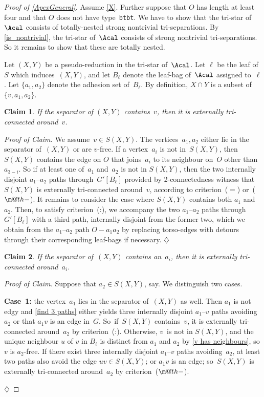 \documentclass{aic}
\makeatletter
\newenvironment{cproof}{\noindent\textit{Proof of Claim.}}{\phantom{!}\!\hfill$\diamondsuit$}
\theoremstyle{plain}
\newtheorem{sublem}{Claim}[thm]
\theoremstyle{definition}
\theoremstyle{plain}
\newcommand{\dotminus}{\mathbin{\text{\@dotminus}}}
\newcommand{\@dotminus}{%
  \ooalign{\hidewidth\raise1.2ex\hbox{.}\hidewidth\cr$\m@th-$\cr}%
}
\theoremstyle{plain}
\newcommand{\ty}[1]{{\tt#1}}
\makeatother
\begin{document}
\begin{proof}[Proof of \autoref{ApexGeneral}]
Assume \autoref{X}.
Further suppose that $O$ has length at least four and that $O$ does not have type~\ty{btbt}.
We have to show that the tri-star of~$\Acal$ consists of totally-nested strong nontrivial tri-separations.
By \autoref{is_nontrivial}, the tri-star of~$\Acal$ consists of strong nontrivial tri-separations.
So it remains to show that these are totally nested.

Let $(X,Y)$ be a pseudo-reduction in the tri-star of~$\Acal$.
Let $\ell$ be the leaf of~$S$ which induces~$(X,Y)$, and let $B_\ell$ denote the leaf-bag of~$\Acal$ assigned to~$\ell$.
Let $\{a_1,a_2\}$ denote the adhesion set of~$B_\ell$.
By definition, $X\cap Y$ is a subset of~$\{v,a_1,a_2\}$.

\begin{sublem}\label{sublemvinsep}
If the separator of $(X,Y)$ contains~$v$, then it is externally tri-connected around~$v$.
\end{sublem}


\begin{cproof}
We assume~$v\in S(X,Y)$.
The vertices~$a_1,a_2$ either lie in the separator 
of~$(X,Y)$ or are $v$-free.
If a vertex~$a_i$ is not in~$S(X,Y)$, then~$S(X,Y)$ contains the edge on $O$ that joins~$a_i$ to its neighbour on~$O$ other than $a_{3-i}$.
So if at least one of~$a_1$ and~$a_2$ is not in $S(X,Y)$, then the two internally disjoint $a_1$--$a_2$ paths through~$G'[B_\ell]$ provided by 2-connectedness witness that $S(X,Y)$ is externally tri-connected around~$v$, according to criterion~($=$) or~($\dotminus$).
It remains to consider the case where $S(X,Y)$ contains both $a_1$ and~$a_2$.
Then, to satisfy criterion~(:), we accompany the two $a_1$--$a_2$ paths through~$G'[B_\ell]$ with a third path, internally disjoint from the former two, which we obtain from the $a_1$--$a_2$ path 
$O-a_1 a_2$ by 
replacing torso-edges with detours through their corresponding leaf-bags if necessary. 
\end{cproof}


\begin{sublem}\label{sublem7}
If the separator of~$(X,Y)$ contains an~$a_i$, then it is externally tri-connected around~$a_i$.
\end{sublem}

\begin{cproof}
Suppose that $a_2\in S(X,Y)$, say.
We distinguish two cases.

{\bf Case~1:} the vertex~$a_1$ lies in the separator of~$(X,Y)$ as well.
Then $a_1$ is not edgy and \autoref{find 3 
paths} either yields three 
internally disjoint $a_1$--$v$ paths avoiding $a_{2}$ or that $a_1 v$ is an edge in~$G$. 
So~if~$S(X,Y)$ contains~$v$, it is externally tri-connected around~$a_2$ by criterion~(:).
Otherwise, $v$~is not in $S(X,Y)$,
and the unique neighbour $u$ of $v$ in $B_\ell$ is distinct from $a_1$ and $a_2$ by \autoref{v has neighbours},
so $v$ is $a_2$-free.
If there exist three internally disjoint $a_1$--$v$ paths avoiding~$a_2$, at least two paths also avoid the edge $uv\in S(X,Y)$; or $a_1v$ is an edge; so~$S(X,Y)$ is externally tri-connected around~$a_2$ by criterion~($\dotminus$).
 

\end{cproof}
\end{proof}
\end{document}
